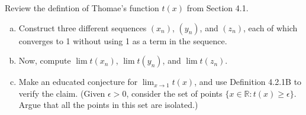 Review the defintion of Thomae's function $t(x)$ from Section 4.1.

\begin{enumerate}[(a)]
\item Construct three different sequences $(x_n)$, $(y_n)$, and $(z_n)$, each of which converges to 1 without using 1 as a term in
the sequence.

\item Now, compute $\lim t(x_n)$, $\lim t(y_n)$, and $\lim t(z_n)$.

\item Make an educated conjecture for $\lim_{x\rightarrow 1} t(x)$, and use Definition 4.2.1B to verify the claim.
(Given $\epsilon > 0$, consider the set of points $\{ x\in\mathbb{R} : t(x) \geq \epsilon \}$.
Argue that all the points in this set are isolated.)
\end{enumerate}